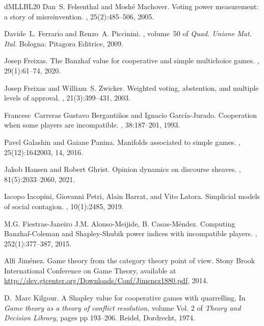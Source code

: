 \documentclass[11pt]{amsart}
\theoremstyle{plain}
\theoremstyle{definition}
\theoremstyle{remark}
\begin{document}
\begin{thebibliography}{dMLLBL20}
Dan~S. Felsenthal and Mosh\'{e} Machover.
\newblock Voting power measurement: a story of misreinvention.
, 25(2):485--506, 2005.

Davide~L. Ferrario and Renzo~A. Piccinini.
, volume~50 of {\em Quad.
  Unione Mat. Ital.}
\newblock Bologna: Pitagora Editrice, 2009.

Josep Freixas.
\newblock The {B}anzhaf value for cooperative and simple multichoice games.
, 29(1):61--74, 2020.

Josep Freixas and William~S. Zwicker.
\newblock Weighted voting, abstention, and multiple levels of approval.
, 21(3):399--431, 2003.

Francesc~Carreras Gustavo Berganti\~nos and Ignacio Garc\'ia-Jurado.
\newblock Cooperation when some players are incompatible.
, 38:187--201, 1993.

Pavel Galashin and Gaiane Panina.
\newblock Manifolds associated to simple games.
, 25(12):1642003, 14, 2016.

Jakob Hansen and Robert Ghrist.
\newblock Opinion dynamics on discourse sheaves.
, 81(5):2033--2060, 2021.

Iacopo Iacopini, Giovanni Petri, Alain Barrat, and Vito Latora.
\newblock Simplicial models of social contagion.
, 10(1):2485, 2019.

M.G. Fiestras-Janeiro J.M. Alonso-Meijide, B. Casas-M\'endez.
\newblock Computing {B}anzhaf-{C}oleman and {S}hapley-{S}hubik power indices
  with incompatible players.
, 252(1):377--387, 2015.

Alfi Jim\'enez.
\newblock Game theory from the category theory point of view.
\newblock Stony Brook International Conference on Game Theory, available at
  \url{http://dev.gtcenter.org/Downloads/Conf/Jimenez1880.pdf}, 2014.

D.~Marc Kilgour.
\newblock A {S}hapley value for cooperative games with quarrelling.
\newblock In {\em Game theory as a theory of conflict resolution}, volume Vol.
  2 of {\em Theory and Decision Library}, pages pp 193--206. Reidel, Dordrecht,
  1974.


\end{thebibliography}
\end{document}
